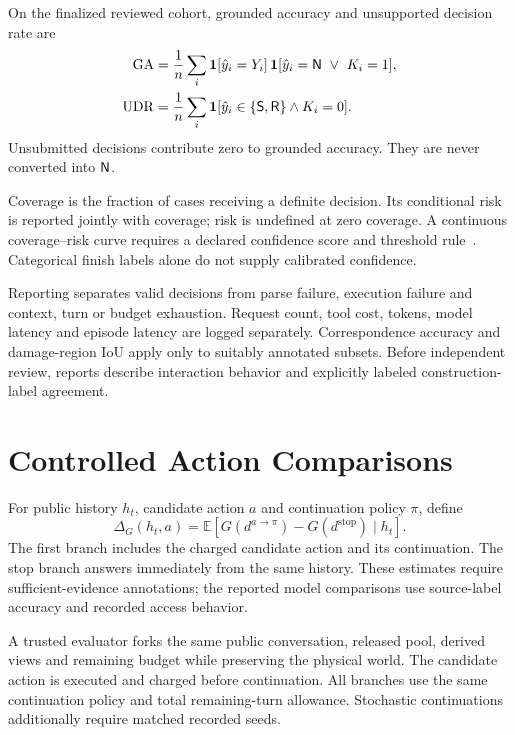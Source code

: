On the finalized reviewed cohort, grounded accuracy and unsupported decision rate are
\begin{align}
\mathrm{GA}
 &=\frac{1}{n}\sum_i\mathbf{1}[\hat y_i=Y_i]\,
   \mathbf{1}[\hat y_i=\mathsf{N}\ \lor\ K_i=1],\\
\mathrm{UDR}
 &=\frac{1}{n}\sum_i
   \mathbf{1}[\hat y_i\in\{\mathsf{S},\mathsf{R}\}\land K_i=0].
\end{align}
Unsubmitted decisions contribute zero to grounded accuracy.
They are never converted into \(\mathsf{N}\).

Coverage is the fraction of cases receiving a definite decision.
Its conditional risk is reported jointly with coverage; risk is undefined at zero coverage.
A continuous coverage--risk curve requires a declared confidence score and threshold rule~\cite{selective}.
Categorical finish labels alone do not supply calibrated confidence.

Reporting separates valid decisions from parse failure, execution failure and context, turn or budget exhaustion.
Request count, tool cost, tokens, model latency and episode latency are logged separately.
Correspondence accuracy and damage-region IoU apply only to suitably annotated subsets.
Before independent review, reports describe interaction behavior and explicitly labeled construction-label agreement.

\section{Controlled Action Comparisons}

For public history \(h_t\), candidate action \(a\) and continuation policy \(\pi\), define
\begin{equation}
\Delta_G(h_t,a)=
\mathbb{E}\!\left[
G(d^{a\rightarrow\pi})-G(d^{\mathrm{stop}})
\mid h_t\right].
\end{equation}
The first branch includes the charged candidate action and its continuation.
The stop branch answers immediately from the same history.
These estimates require sufficient-evidence annotations; the reported model comparisons use source-label accuracy and recorded access behavior.

A trusted evaluator forks the same public conversation, released pool, derived views and remaining budget while preserving the physical world.
The candidate action is executed and charged before continuation.
All branches use the same continuation policy and total remaining-turn allowance.
Stochastic continuations additionally require matched recorded seeds.

